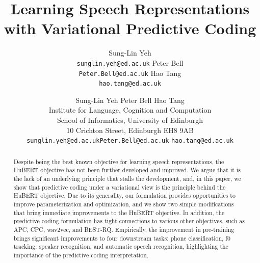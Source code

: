 \documentclass[11pt,a4paper]{article}
\title{Learning Speech Representations with Variational Predictive Coding}
\author{
  Sung-Lin Yeh
  \\
  \texttt{\small sunglin.yeh@ed.ac.uk}
  \And
  Peter Bell
  \\
  \texttt{\small Peter.Bell@ed.ac.uk}
  \And
  Hao Tang
  \\
  \texttt{\small hao.tang@ed.ac.uk}
}
\author{{Sung-Lin Yeh \qquad Peter Bell \qquad Hao Tang} \\              
Institute for Language, Cognition and Computation \\
School of Informatics, University of Edinburgh \\
10 Crichton Street, Edinburgh EH8 9AB\\
\texttt{\small sunglin.yeh@ed.ac.uk}\quad \texttt{\small Peter.Bell@ed.ac.uk} \quad \texttt{\small hao.tang@ed.ac.uk}}
\date{}
\begin{document}
\maketitle
\begin{abstract}
%
%
%
%
%
%
%

Despite being the best known objective for learning speech representations, the HuBERT objective has not been further developed and improved.
We argue that it is the lack of an underlying principle that stalls the development,
and, in this paper, we show that predictive coding under a variational view is the principle behind the HuBERT objective.
Due to its generality, our formulation provides opportunities to improve parameterization and optimization, and we show two simple modifications that bring immediate improvements to the HuBERT objective.
In addition, the predictive coding formulation has tight connections to various other objectives, such as APC, CPC, wav2vec, and BEST-RQ.
Empirically, the improvement in pre-training brings significant improvements to four downstream tasks: phone classification, f0 tracking, speaker recognition, and automatic speech recognition, highlighting the importance of the predictive coding interpretation.
\end{abstract}








%
%

\balance{


}
\newpage
\nobalance
\appendix

\end{document}
